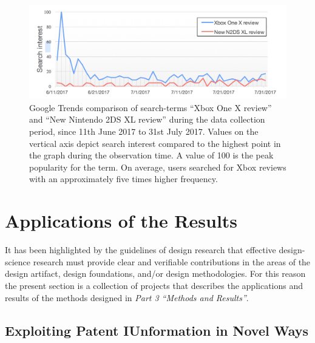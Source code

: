 \documentclass[]{book}
\theoremstyle{definition}
\theoremstyle{definition}
\theoremstyle{definition}
\theoremstyle{remark}
\begin{document}
\begin{figure}

{\centering \includegraphics[width=1\linewidth]{_bookdown_files/figures/tweet_search_interest} 

}

\caption{Google Trends comparison of search-terms “Xbox One X review” and “New Nintendo 2DS XL review” during the data collection period, since 11th June 2017 to 31st July 2017. Values on the vertical axis depict search interest compared to the highest point in the graph during the observation time. A value of 100 is the peak popularity for the term. On average, users searched for Xbox reviews with an approximately five times higher frequency.}\label{fig:tweetsearchinterest}
\end{figure}

\part{Applications of the
Results}\label{part-applications-of-the-results}

It has been highlighted by the guidelines of design research
\citep{bichler2006design} that effective design-science research must
provide clear and verifiable contributions in the areas of the design
artifact, design foundations, and/or design methodologies. For this
reason the present section is a collection of projects that describes
the applications and results of the methods designed in \emph{Part 3
``Methods and Results''}.

\chapter{Exploiting Patent IUnformation in Novel
Ways}\label{explpatentnovel}
\end{document}
